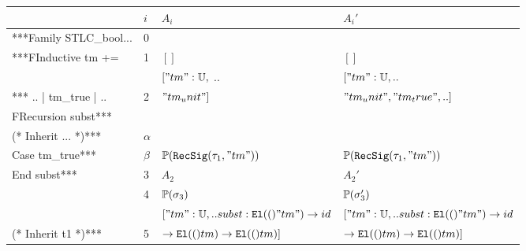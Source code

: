\begin{table}[]
  \begin{tabular}{|l|l|l|l|}
  \hline
                          & $i$      & $A_i$             & $A_i'$             \\ \hline
  ***Family STLC\_bool... & 0        &                   &                    \\ \hline
  ***FInductive tm +=     & 1        & $[]$              & $[]$               \\ \hline
                          &          & $["tm" : \mathbb{U},$ .. & $["tm" : \mathbb{U}, ..$  \\
  \multirow{-2}{*}{*** .. | tm\_true | ..} & \multirow{-2}{*}{2} & $"tm_unit"]$                              & $"tm_unit", "tm_true", .. ]$              \\ \hline
  FRecursion subst***     &          &                   &                    \\ \hline
  \rowcolor[HTML]{E0D7D7} 
  (* Inherit ... *)***    & $\alpha$ &                   &                    \\ \hline
  \rowcolor[HTML]{E0D7D7} 
  Case tm\_true***                         & $\beta$             & $\mathbb{P}({\texttt{RecSig}({\tau_1},{"tm"})})$          & $\mathbb{P}({\texttt{RecSig}({\tau_1},{"tm"})})$          \\ \hline
  End subst***            & 3        & $A_2$             & $A_2'$             \\ \hline
                          & 4        & $\mathbb{P}({\sigma_3})$ & $\mathbb{P}({\sigma_3'})$ \\ \hline
                                           &                     & $["tm":\mathbb{U}, .. subst : \texttt{El}({(})"tm") \to id $ & $["tm":\mathbb{U}, .. subst : \texttt{El}({(})"tm") \to id $ \\
  \multirow{-2}{*}{(* Inherit t1 *)***}    & \multirow{-2}{*}{5} & $ \to \texttt{El}({(})tm) \to \texttt{El}({(})tm) ]$              & $ \to \texttt{El}({(})tm) \to \texttt{El}({(})tm) ]$              \\ \hline
  \end{tabular}
  \end{table}

